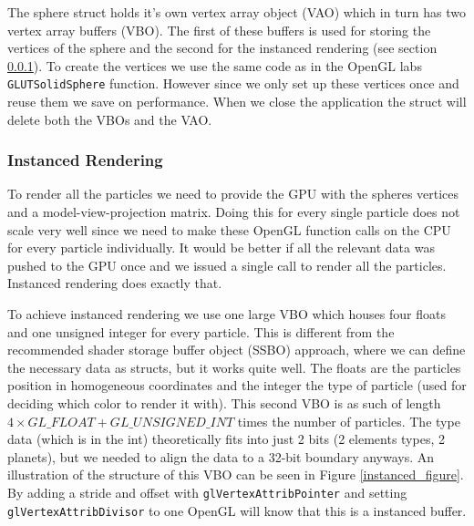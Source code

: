 \documentclass[a4paper]{article}
\begin{document}
The sphere struct holds it's own vertex array object (VAO) which in turn has two vertex array buffers (VBO). 
The first of these buffers is used for storing the vertices of the sphere and the second for the instanced rendering (see section \ref{instanced}). 
To create the vertices we use the same code as in the OpenGL labs \verb|GLUTSolidSphere| function. 
However since we only set up these vertices once and reuse them we save on performance.
When we close the application the struct will delete both the VBOs and the VAO. 

\subsubsection{Instanced Rendering}
\label{instanced}

To render all the particles we need to provide the GPU with the spheres vertices and a model-view-projection matrix. 
Doing this for every single particle does not scale very well since we need to make these OpenGL function calls on the CPU for every particle individually.
It would be better if all the relevant data was pushed to the GPU once and we issued a single call to render all the particles. 
Instanced rendering does exactly that. 

To achieve instanced rendering we use one large VBO which houses four floats and one unsigned integer for every particle. 
This is different from the recommended shader storage buffer object (SSBO) approach, where we can define the necessary data as structs, but it works quite well. 
The floats are the particles position in homogeneous coordinates and the integer the type of particle (used for deciding which color to render it with). 
This second VBO is as such of length $4 \times GL\_FLOAT + GL\_UNSIGNED\_INT$ times the number of particles. 
The type data (which is in the int) theoretically fits into just 2 bits (2 elements types, 2 planets), but we needed to align the data to a 32-bit boundary anyways.
An illustration of the structure of this VBO can be seen in Figure \ref{instanced_figure}.
By adding a stride and offset with \verb|glVertexAttribPointer| and setting \verb|glVertexAttribDivisor| to one OpenGL will know that this is a instanced buffer. 
\end{document}
